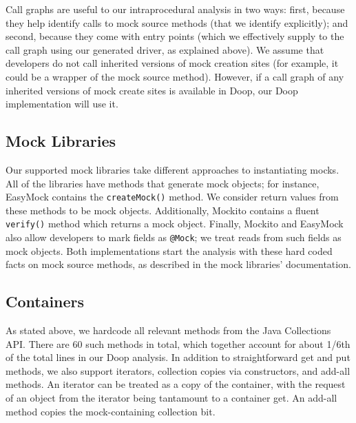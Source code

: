 Call graphs are useful to our intraprocedural analysis in two ways: first, because they help identify calls to mock source methods (that we identify explicitly); and second, because they come with entry points (which we effectively supply to the call graph using our generated driver, as explained above). We assume that developers do not call inherited versions of mock creation sites (for example, it could be a wrapper of the mock source method). However, if a call graph of any inherited versions of mock create sites is available in Doop, our Doop implementation will use it. 

\subsection{Mock Libraries}

Our supported mock libraries take different approaches to instantiating mocks. All of the libraries have methods that generate mock objects; for instance, EasyMock contains the \texttt{createMock()} method. We consider return values from these methods to be mock objects. Additionally, Mockito contains a fluent \texttt{verify()} method which returns a mock object. Finally, Mockito and EasyMock also allow developers to mark fields as \texttt{@Mock}; we treat reads from such fields as mock objects. Both implementations start the analysis with these hard coded facts on mock source methods, as described in the mock libraries' documentation.

\subsection{Containers}

As stated above, we hardcode all relevant methods from the Java Collections API. There are 60 such methods in total, which together account for about 1/6th of the total lines in our Doop analysis. In addition to straightforward get and put methods, we also support iterators, collection copies via constructors, and add-all methods. An iterator can be treated as a copy of the container, with the request of an object from the iterator being tantamount to a container get. An add-all method copies the mock-containing collection bit.

